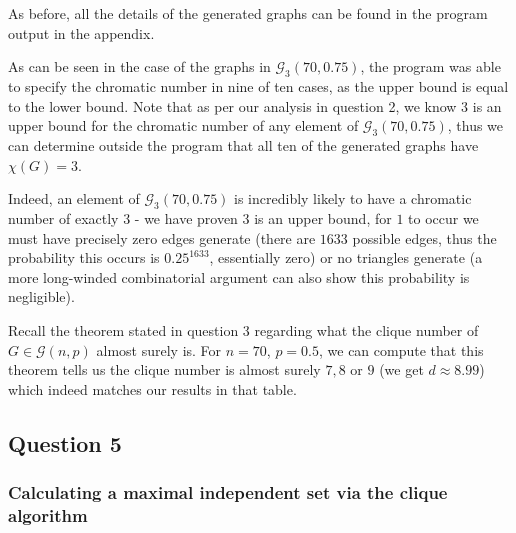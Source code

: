 \documentclass{article}
\begin{document}
\begin{center}
\end{center}

As before, all the details of the generated graphs can be found in the program output in the appendix.

As can be seen in the case of the graphs in $\mathcal{G}_3(70,0.75)$, the program was able to specify the chromatic number in nine of ten cases, as the upper bound is equal to the lower bound. Note that as per our analysis in question 2, we know $3$ is an upper bound for the chromatic number of any element of $\mathcal{G}_3(70,0.75)$, thus we can determine outside the program that all ten of the generated graphs have $\chi(G) = 3$.

Indeed, an element of $\mathcal{G}_3(70,0.75)$ is incredibly likely to have a chromatic number of exactly $3$ - we have proven $3$ is an upper bound, for $1$ to occur we must have precisely zero edges generate (there are $1633$ possible edges, thus the probability this occurs is $0.25^{1633}$, essentially zero) or no triangles generate (a more long-winded combinatorial argument can also show this probability is negligible).

Recall the theorem stated in question 3 regarding what the clique number of $G \in \mathcal{G}(n,p)$ almost surely is. For $n=70$, $p=0.5$, we can compute that this theorem tells us the clique number is almost surely $7, 8$ or $9$ (we get $d \approx 8.99$) which indeed matches our results in that table.

\subsection{Question 5}

\subsubsection{Calculating a maximal independent set via the clique algorithm}
\end{document}
